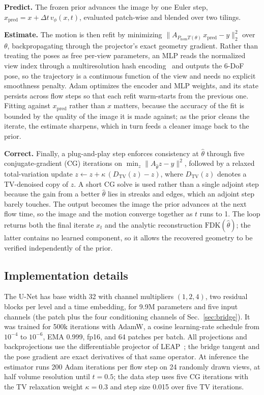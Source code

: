 \documentclass[11pt]{article}
\newcommand{\FDK}{\mathrm{FDK}}
\newcommand{\thetahat}{\hat\theta}
\newcommand{\Pnom}{P_{\mathrm{nom}}}
\begin{document}
\textbf{Predict.} The frozen prior advances the image by one Euler step,
$x_{\mathrm{pred}} = x + \Delta t\,v_\phi(x,t)$, evaluated patch-wise and blended over two
tilings.

\textbf{Estimate.} The motion is then refit by minimizing
$\|A_{\Pnom T(\theta)}\,x_{\mathrm{pred}} - y\|_2^2$ over $\theta$, backpropagating through
the projector's exact geometry gradient. Rather than treating the poses as free per-view
parameters, an MLP reads the normalized view index through a multiresolution hash
encoding~\cite{mueller22} and outputs the 6-DoF pose, so the trajectory is a continuous
function of the view and needs no explicit smoothness penalty. Adam optimizes the encoder
and MLP weights, and its state persists across flow steps so that each refit warm-starts
from the previous one. Fitting against $x_{\mathrm{pred}}$ rather than $x$ matters, because
the accuracy of the fit is bounded by the quality of the image it is made against; as the
prior cleans the iterate, the estimate sharpens, which in turn feeds a cleaner image back to
the prior.

\textbf{Correct.} Finally, a plug-and-play step enforces consistency at $\thetahat$
through five conjugate-gradient (CG) iterations on $\min_z \|A_{\thetahat}z - y\|^2$,
followed by a relaxed total-variation update
$z \leftarrow z + \kappa\,(D_{\mathrm{TV}}(z) - z)$, where $D_{\mathrm{TV}}(z)$ denotes a
TV-denoised copy of $z$. A short CG solve is used rather than a single adjoint step because
the gain from a better $\thetahat$ lies in streaks and edges, which an adjoint step barely
touches. The output becomes the image the prior advances at the next flow time, so the
image and the motion converge together as $t$ runs to 1. The loop returns both the final
iterate $x_t$ and the analytic reconstruction $\FDK(\thetahat)$; the latter contains no
learned component, so it allows the recovered geometry to be verified independently of the
prior.

\subsection{Implementation details}
\label{sec:impl}

The U-Net has base width 32 with channel multipliers $(1,2,4)$, two residual blocks per
level and a time embedding, for 9.9M parameters and five input channels (the patch plus the
four conditioning channels of Sec.~\ref{sec:bridge}). It was trained for 500k iterations
with AdamW, a cosine learning-rate schedule from $10^{-4}$ to $10^{-6}$, EMA 0.999, fp16,
and 64 patches per batch. All projections and backprojections use the differentiable
projector of LEAP~\cite{leap23}; the bridge tangent and the pose gradient are exact
derivatives of that same operator. At inference the estimator runs 200 Adam
iterations per flow step on 24 randomly drawn views, at half volume resolution until
$t=0.5$; the data step uses five CG iterations with the TV relaxation weight
$\kappa = 0.3$ and step size 0.015 over five TV iterations.
\end{document}
